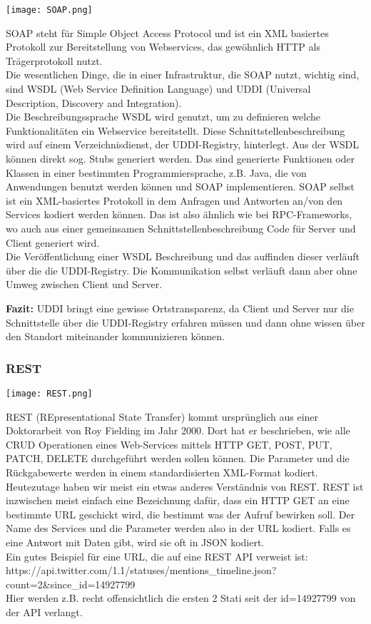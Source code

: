 \texttt{[image: SOAP.png]}

SOAP steht für Simple Object Access Protocol und ist ein XML basiertes Protokoll zur Bereitstellung von Webservices, das gewöhnlich HTTP als Trägerprotokoll nutzt.\\
Die wesentlichen Dinge, die in einer Infrastruktur, die SOAP nutzt, wichtig sind, sind  WSDL (Web Service Definition Language) und UDDI (Universal Description, Discovery and Integration).\\
Die Beschreibungssprache WSDL wird genutzt, um zu definieren welche Funktionalitäten ein Webservice bereitstellt. Diese Schnittstellenbeschreibung wird auf einem Verzeichnisdienst, der UDDI-Registry, hinterlegt. Aus der WSDL können direkt sog. Stubs generiert werden. Das sind generierte Funktionen oder Klassen in einer bestimmten Programmiersprache, z.B. Java, die von Anwendungen benutzt werden können und SOAP implementieren. SOAP selbst ist ein XML-basiertes Protokoll in dem Anfragen und Antworten an/von den Services kodiert werden können. Das ist also ähnlich wie bei RPC-Frameworks, wo auch aus einer gemeinsamen Schnittstellenbeschreibung Code für Server und Client generiert wird.\\
Die Veröffentlichung einer WSDL Beschreibung und das auffinden dieser verläuft über die die UDDI-Registry. Die Kommunikation selbst verläuft dann aber ohne Umweg zwischen Client und Server.

\textbf{Fazit:}
UDDI bringt eine gewisse Ortstransparenz, da Client und Server nur die Schnittstelle über die UDDI-Registry erfahren müssen und dann ohne wissen über den Standort miteinander kommunizieren können.

\subsubsection{REST}

\texttt{[image: REST.png]}

REST (REpresentational State Transfer) kommt ursprünglich aus einer Doktorarbeit von Roy Fielding im Jahr 2000. Dort hat er beschrieben, wie alle CRUD Operationen eines Web-Services mittels HTTP GET, POST, PUT, PATCH, DELETE durchgeführt werden sollen können. Die Parameter und die Rückgabewerte werden in einem standardisierten XML-Format kodiert.\\
Heutezutage haben wir meist ein etwas anderes Verständnis von REST. REST ist inzwischen meist einfach eine Bezeichnung dafür, dass ein HTTP GET an eine bestimmte URL geschickt wird, die bestimmt was der Aufruf bewirken soll. Der Name des Services und die Parameter werden also in der URL kodiert. Falls es eine Antwort mit Daten gibt, wird sie oft in JSON kodiert.\\
Ein gutes Beispiel für eine URL, die auf eine REST API verweist ist:\\
https://api.twitter.com/1.1/statuses/mentions\_timeline.json?count=2\&since\_id=14927799\\
Hier werden z.B. recht offensichtlich die ersten 2 Stati seit der id=14927799 von der API verlangt.\\

